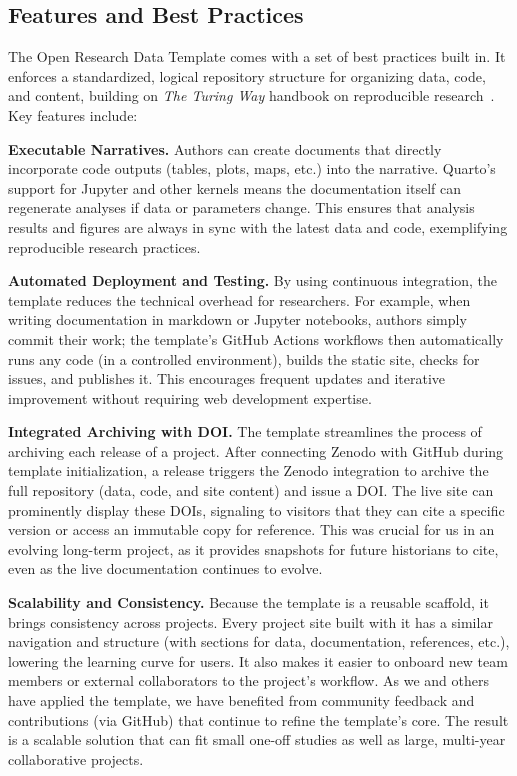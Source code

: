 \documentclass[final]{anthology-ch} %
\begin{document}
\subsection{Features and Best Practices}\label{features-and-best-practices}

The Open Research Data Template comes with a set of best practices built in. It enforces a standardized, logical repository structure for organizing data, code, and content, building on \emph{The Turing Way} handbook on reproducible research~\cite{theturingwaycommunity2025}. Key features include:

\noindent
\textbf{Executable Narratives.} Authors can create documents that directly incorporate code outputs (tables, plots, maps, etc.) into the narrative. Quarto's support for Jupyter and other kernels means the documentation itself can regenerate analyses if data or parameters change. This ensures that analysis results and figures are always in sync with the latest data and code, exemplifying reproducible research practices.

\noindent
\textbf{Automated Deployment and Testing.} By using continuous integration, the template reduces the technical overhead for researchers. For example, when writing documentation in markdown or Jupyter notebooks, authors simply commit their work; the template's GitHub Actions workflows then automatically runs any code (in a controlled environment), builds the static site, checks for issues, and publishes it. This encourages frequent updates and iterative improvement without requiring web development expertise.

\noindent
\textbf{Integrated Archiving with DOI.} The template streamlines the process of archiving each release of a project. After connecting Zenodo with GitHub during template initialization, a release triggers the Zenodo integration to archive the full repository (data, code, and site content) and issue a DOI. The live site can prominently display these DOIs, signaling to visitors that they can cite a specific version or access an immutable copy for reference. This was crucial for us in an evolving long-term project, as it provides snapshots for future historians to cite, even as the live documentation continues to evolve.

\noindent
\textbf{Scalability and Consistency.} Because the template is a reusable scaffold, it brings consistency across projects. Every project site built with it has a similar navigation and structure (with sections for data, documentation, references, etc.), lowering the learning curve for users. It also makes it easier to onboard new team members or external collaborators to the project's workflow. As we and others have applied the template, we have benefited from community feedback and contributions (via GitHub) that continue to refine the template's core. The result is a scalable solution that can fit small one-off studies as well as large, multi-year collaborative projects.
\end{document}
